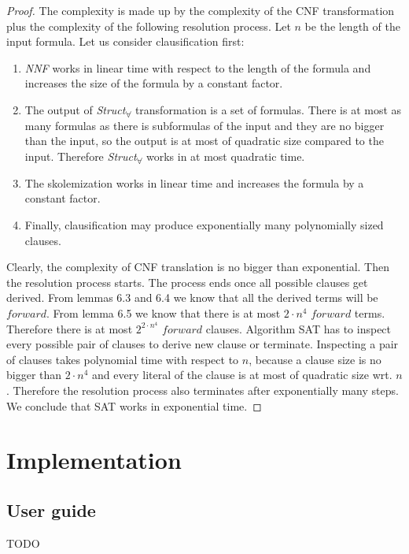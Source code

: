 \documentclass[english, shortabstract]{iithesis}
\theoremstyle{definition} \newtheorem{definition}{Definition}[chapter]
\theoremstyle{remark} \newtheorem{remark}[definition]{Observation}
\theoremstyle{plain} \newtheorem{theorem}[definition]{Theorem}
\theoremstyle{plain} \newtheorem{lemma}[definition]{Lemma}
\begin{document}
\begin{proof}
The complexity is made up by the complexity of the CNF transformation plus the complexity of the following resolution process.
Let $n$ be the length of the input formula.
Let us consider clausification first:
\begin{enumerate}
    \item \emph{NNF} works in linear time with respect to the length of the formula and increases the size of the formula by a constant factor.
    \item The output of \emph{Struct\textsubscript{{$\forall$}}} transformation is a set of formulas. There is at most as many formulas as there is 
    subformulas of the input and they are no bigger than the input, so the output is at most of quadratic size compared to the input.
    Therefore \emph{Struct\textsubscript{{$\forall$}}} works in at most quadratic time.
    \item The skolemization works in linear time and increases the formula by a constant factor.
    \item Finally, clausification may produce exponentially many polynomially sized clauses.
\end{enumerate}
Clearly, the complexity of CNF translation is no bigger than exponential.
Then the resolution process starts. The process ends once all possible clauses get derived.
From lemmas 6.3 and 6.4 we know that all the derived terms will be $forward$.
From lemma 6.5 we know that there is at most $2\cdot n^4$ $forward$ terms.
Therefore there is at most $2^{2\cdot n^4}$ $forward$ clauses. 
Algorithm SAT has to inspect every possible pair of clauses to derive new clause or terminate.
Inspecting a pair of clauses takes polynomial time with respect to $n$, because 
a clause size is no bigger than $2\cdot n^4$ and every literal of the clause is at most of quadratic size wrt. $n$.
Therefore the resolution process also terminates after exponentially many steps.
We conclude that SAT works in exponential time.
\end{proof}

\chapter{Implementation}

\section{User guide}

TODO


\end{document}
